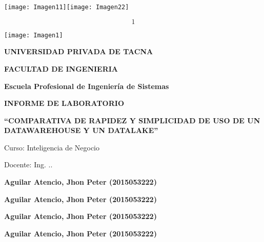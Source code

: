 \documentclass{article} %
\begin{document}


\noindent 

\noindent 

\noindent 

\noindent 

\noindent \texttt{[image: Imagen11]}\texttt{[image: Imagen22]}\textbf{ }

\noindent 

\noindent 
\[1\] 


\noindent \texttt{[image: Imagen1]}\textbf{\underbar{}}

\noindent \textbf{}

\noindent \textbf{UNIVERSIDAD PRIVADA DE TACNA}

\noindent \textbf{}

\noindent \textbf{FACULTAD DE INGENIERIA}

\noindent \textbf{\textit{}}

\noindent \textbf{\textit{}}

\noindent \textbf{Escuela Profesional de Ingenier\'{i}a de Sistemas}

\noindent \textbf{}

\noindent 

\noindent \textbf{ INFORME DE LABORATORIO}

\noindent \textbf{``COMPARATIVA DE RAPIDEZ Y SIMPLICIDAD DE USO DE UN DATAWAREHOUSE Y UN DATALAKE''}

\noindent \textbf{}

\noindent Curso: Inteligencia de Negocio

\noindent \textbf{\textit{}}

\noindent \textbf{}

\noindent \textbf{}

\noindent Docente: Ing. ..

\noindent \textbf{}

\noindent \textbf{Aguilar Atencio, Jhon Peter (2015053222)}

\noindent \textbf{Aguilar Atencio, Jhon Peter (2015053222)}

\noindent \textbf{Aguilar Atencio, Jhon Peter (2015053222)}

\noindent \textbf{Aguilar Atencio, Jhon Peter (2015053222)}

\noindent \textbf{}
\end{document}
